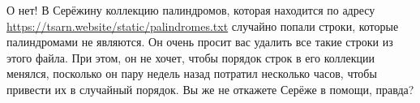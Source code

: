 О нет! В Серёжину коллекцию палиндромов, которая находится по адресу \url{https://tsarn.website/static/palindromes.txt} случайно попали строки, которые палиндромами не являются. Он очень просит вас удалить все такие строки из этого файла. При этом, он не хочет, чтобы порядок строк в его коллекции менялся, посколько он пару недель назад потратил несколько часов, чтобы привести их в случайный порядок. Вы же не откажете Серёже в помощи, правда?